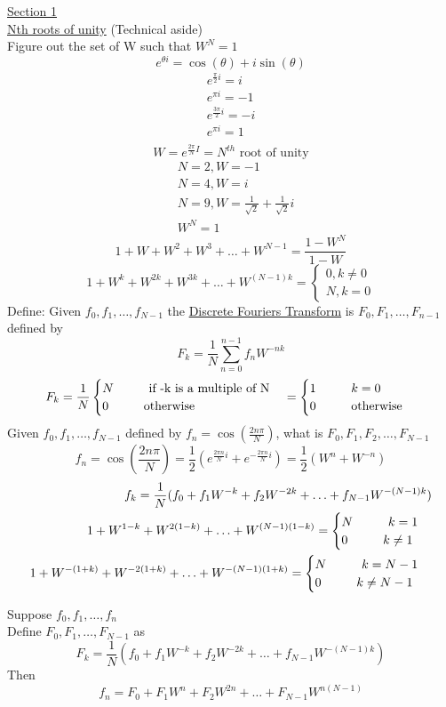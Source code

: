 \documentclass[10pt,usletter]{article}
\newcommand{\tab}[1][1cm]{\hspace*{#1}}
\begin{document}
\underline{Section 1}\\
\underline{Nth roots of unity} (Technical aside)\\
\tab Figure out the set of W such that $W^N=1$
$$e^{\theta i} = \cos(\theta) + i\sin(\theta)$$
\begin{align*}
e^{\frac{\pi}{2}i}=i\\
e^{\pi i}=-1\\
e^{\frac{3\pi}{2}i}=-i\\
e^{\pi i} = 1\\
\end{align*}
$$W=e^{\frac{2\pi}{N}I}= N^{th}\text{ root of unity}$$
\begin{align*}
&N = 2, W=-1\\
&N = 4, W= i\\
&N= 9, W = \frac{1}{\sqrt{2}}+\frac{1}{\sqrt{2}}i\\
&W^N = 1
\end{align*}
$$1+W+W^2+W^3+\hdots+W^{N-1}=\frac{1-W^N}{1-W}$$
$$1+W^k+W^{2k}+W^{3k}+\hdots+W^{(N-1)k}=
\begin{cases}
0,k \not = 0\\
N,k = 0
\end{cases}$$
Define: Given $f_0,f_1,\hdots,f_{N-1}$ the \underline{Discrete Fouriers Transform} is $F_0, F_1,\hdots, F_{n-1}$ defined by $$F_k=\frac{1}{N}\sum_{n=0}^{n-1}f_nW^{-nk}$$
$$F_k=\frac{1}{N}\begin{cases}N \tab\text{if -k is a multiple of N}\\0\tab\text{otherwise}\end{cases}=\begin{cases}1\tab k=0\\0\tab \text{otherwise}\end{cases}$$
Given $f_0,f_1,\hdots,f_{N-1}$ defined by $f_n=\cos(\frac{2n\pi}{N})$, what is $F_0,F_1,F_2,\hdots,F_{N-1}$
$$f_n=\cos(\frac{2n\pi}{N})=\frac{1}{2}(e^{\frac{2\pi n}{N}i}+e^{-\frac{2\pi n}{N}i})=\frac{1}{2}(W^n+W^{-n})$$
\begin{align*}
f_k=\frac{1}{N}(f_0+f_1W^{-k}+f_2W^{-2k}+\hdots+f_{N-1}W^{-(N-1)k})\\
1+W^{1-k}+W^{2(1-k)}+\hdots+W^{(N-1)(1-k)}=\begin{cases}N \tab k=1\\0 \tab k \not= 1\end{cases}\\
1+W^{-(1+k)}+W^{-2(1+k)}+\hdots+W^{-(N-1)(1+k)}=\begin{cases}N \tab k=N-1\\0 \tab k \not= N-1\end{cases}
\end{align*}


Suppose $f_0,f_1,\hdots,f_n$\\
Define $F_0, F_1,\hdots,F_{N-1}$ as $$F_k=\frac{1}{N}(f_0+f_1W^{-k}+f_2W^{-2k}+\hdots+f_{N-1}W^{-(N-1)k})$$
Then $$f_n=F_0+F_1W^n+F_2W^{2n}+\hdots+F_{N-1}W^{n(N-1)}$$
\end{document}
